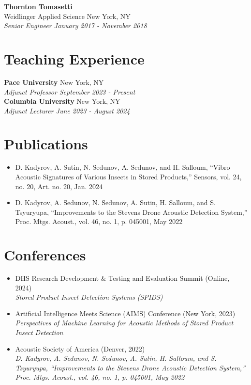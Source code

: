 \begin{singlespace}
\textbf{Thornton Tomasetti}\\
Weidlinger Applied Science \hfill New York, NY \\
\textit{Senior Engineer \hfill January 2017 - November 2018} \\

\section*{Teaching Experience}
\textbf{Pace University} \hfill New York, NY \\
\textit{Adjunct Professor \hfill September 2023 - Present} \\

\textbf{Columbia University} \hfill New York, NY \\
\textit{Adjunct Lecturer \hfill June 2023 - August 2024} \\

\section*{Publications}
\begin{itemize}
  \item D. Kadyrov, A. Sutin, N. Sedunov, A. Sedunov, and H. Salloum, ``Vibro-Acoustic Signatures of Various Insects in Stored Products,'' Sensors, vol. 24, no. 20, Art. no. 20, Jan. 2024
  \item D. Kadyrov, A. Sedunov, N. Sedunov, A. Sutin, H. Salloum, and S. Tsyuryupa, ``Improvements to the Stevens Drone Acoustic Detection System,'' Proc. Mtgs. Acoust., vol. 46, no. 1, p. 045001, May 2022
\end{itemize}

\section*{Conferences}
\begin{itemize}
  \item DHS Research Development \& Testing and Evaluation Summit (Online, 2024)\\
  \textit{Stored Product Insect Detection Systems (SPIDS)}
  \item Artificial Intelligence Meets Science (AIMS) Conference (New York, 2023)\\
  \textit{Perspectives of Machine Learning for Acoustic Methods of Stored Product Insect Detection}
  \item Acoustic Society of America (Denver, 2022)\\
  \textit{D. Kadyrov, A. Sedunov, N. Sedunov, A. Sutin, H. Salloum, and S. Tsyuryupa, ``Improvements to the Stevens Drone Acoustic Detection System,'' Proc. Mtgs. Acoust., vol. 46, no. 1, p. 045001, May 2022}
\end{itemize}
\end{singlespace}
